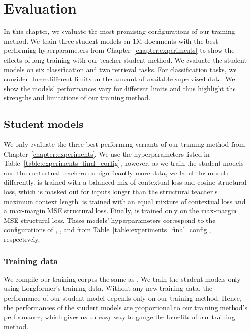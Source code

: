 \chapter{Evaluation}\label{chapter:evaluation}

In this chapter, we evaluate the most promising configurations of our training
method. We train three student models on 1M documents with the best-performing
hyperparameters from Chapter~\ref{chapter:experiments} to show the effects of
long training with our teacher-student method. We evaluate the student models
on six classification and two retrieval tasks. For classification tasks, we
consider three different limits on the amount of available supervised data. We
show the models' performances vary for different limits and thus highlight
the strengths and limitations of our training method.

\section{Student models}

We only evaluate the three best-performing variants of our training method from
Chapter~\ref{chapter:experiments}. We use the hyperparameters listed in Table~\ref{table:experiments_final_config}, however, as we train the student models and the contextual teachers on significantly
more data, we label the models differently. {\CosineStudent}
is trained with a balanced mix of contextual loss and cosine structural loss,
which is masked out for inputs longer than the structural teacher's maximum
context length. {\MSEStudent} is trained with an equal mixture of contextual
loss and a max-margin MSE structural loss. Finally, {\OnlyMSEStudent} is
trained only on the max-margin MSE structural loss. These models'
hyperparameters correspond to the configurations of
, , and
 from Table~\ref{table:experiments_final_config},
respectively.

\subsection{Training data}

We compile our training corpus the same as . We train the
student models only using Longformer's training data. Without any new training
data, the performance of our student model depends only on our training
method. Hence, the performances of the student models are proportional to our
training method's performance, which gives us an easy way to gauge the benefits of our training method.

